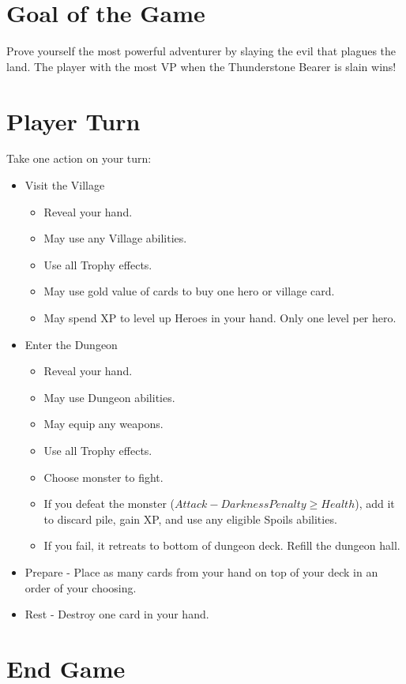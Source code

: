 \documentclass[12pt]{article}
\newenvironment{itemizeCustom}
{\begin{itemize}
  \setlength{\itemsep}{1pt}
  \setlength{\parskip}{0pt}
  \setlength{\parsep}{0pt}}
{\end{itemize}}
\begin{document}
\begin{mdframed}[style = customFrame]
\begin{multicols*}{2}
\section*{Goal of the Game}
Prove yourself the most powerful adventurer by slaying the evil that plagues the land. The player with the most VP when the Thunderstone Bearer is slain wins!

\section*{Player Turn}
Take one action on your turn:
\begin{itemizeCustom}
	\item Visit the Village 
		\begin{itemizeCustom}
			\item Reveal your hand. 
			\item May use any Village abilities. 
			\item Use all Trophy effects. 
			\item May use gold value of cards to buy one hero or village card. 
			\item May spend XP to level up Heroes in your hand. Only one level per hero.
		\end{itemizeCustom}
	\item Enter the Dungeon 
		\begin{itemizeCustom}
			\item Reveal your hand. 
			\item May use Dungeon abilities.
			\item May equip any weapons. 
			\item Use all Trophy effects. 
			\item Choose monster to fight.
			\item If you defeat the monster ($Attack - Darkness Penalty \ge Health$), add it to discard pile, gain XP, and use any eligible Spoils abilities. 
			\item If you fail, it retreats to bottom of dungeon deck. Refill the dungeon hall.
		\end{itemizeCustom}
	\item Prepare - Place as many cards from your hand on top of your deck in an order of your choosing.
	\item Rest - Destroy one card in your hand.
\end{itemizeCustom}

\section*{End Game}

\end{multicols*}
\end{mdframed}
\end{document}
